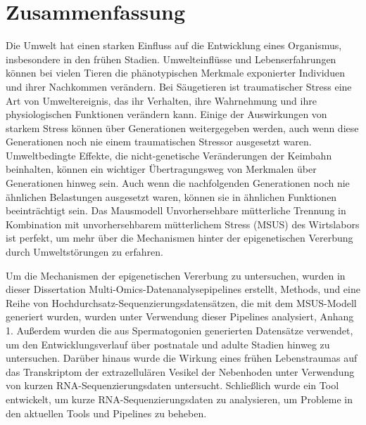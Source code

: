 \documentclass[12pt,twoside]{reedthesis}
\begin{document}
\hypertarget{summary-de}{%
\chapter*{Zusammenfassung}\label{summary-de}}

Die Umwelt hat einen starken Einfluss auf die Entwicklung eines Organismus, insbesondere in den frühen Stadien. Umwelteinflüsse und Lebenserfahrungen können bei vielen Tieren die phänotypischen Merkmale exponierter Individuen und ihrer Nachkommen verändern. Bei Säugetieren ist traumatischer Stress eine Art von Umweltereignis, das ihr Verhalten, ihre Wahrnehmung und ihre physiologischen Funktionen verändern kann. Einige der Auswirkungen von starkem Stress können über Generationen weitergegeben werden, auch wenn diese Generationen noch nie einem traumatischen Stressor ausgesetzt waren. Umweltbedingte Effekte, die nicht-genetische Veränderungen der Keimbahn beinhalten, können ein wichtiger Übertragungsweg von Merkmalen über Generationen hinweg sein. Auch wenn die nachfolgenden Generationen noch nie ähnlichen Belastungen ausgesetzt waren, können sie in ähnlichen Funktionen beeinträchtigt sein. Das Mausmodell Unvorhersehbare mütterliche Trennung in Kombination mit unvorhersehbarem mütterlichem Stress (MSUS) des Wirtslabors ist perfekt, um mehr über die Mechanismen hinter der epigenetischen Vererbung durch Umweltstörungen zu erfahren.

Um die Mechanismen der epigenetischen Vererbung zu untersuchen, wurden in dieser Dissertation Multi-Omics-Datenanalysepipelines erstellt, Methods, und eine Reihe von Hochdurchsatz-Sequenzierungsdatensätzen, die mit dem MSUS-Modell generiert wurden, wurden unter Verwendung dieser Pipelines analysiert, Anhang 1. Außerdem wurden die aus Spermatogonien generierten Datensätze verwendet, um den Entwicklungsverlauf über postnatale und adulte Stadien hinweg zu untersuchen. Darüber hinaus wurde die Wirkung eines frühen Lebenstraumas auf das Transkriptom der extrazellulären Vesikel der Nebenhoden unter Verwendung von kurzen RNA-Sequenzierungsdaten untersucht. Schließlich wurde ein Tool entwickelt, um kurze RNA-Sequenzierungsdaten zu analysieren, um Probleme in den aktuellen Tools und Pipelines zu beheben.
\end{document}
